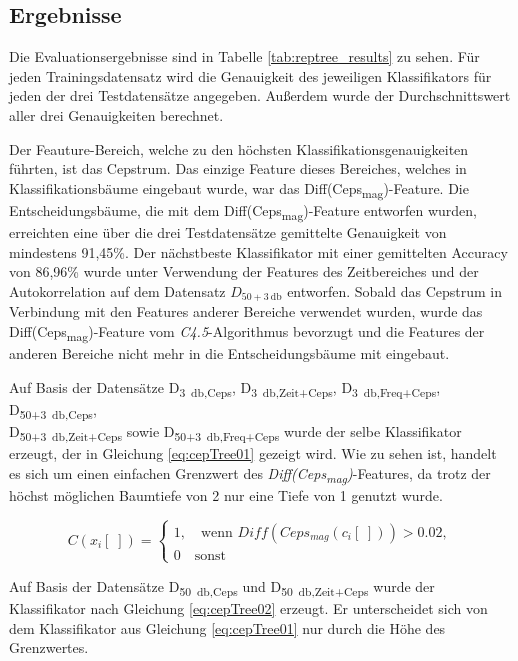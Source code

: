 \subsection{Ergebnisse}
\label{sec:vad_results}

Die Evaluationsergebnisse sind in Tabelle \ref{tab:reptree_results} zu sehen. Für jeden Trainingsdatensatz wird die Genauigkeit des jeweiligen Klassifikators für jeden der drei Testdatensätze angegeben. Außerdem wurde der Durchschnittswert aller drei Genauigkeiten berechnet.

Der Feauture-Bereich, welche zu den höchsten Klassifikationsgenauigkeiten führten, ist das Cepstrum. Das einzige Feature dieses Bereiches, welches in Klassifikationsbäume eingebaut wurde, war das Diff(Ceps\textsubscript{mag})-Feature. Die Entscheidungsbäume, die mit dem Diff(Ceps\textsubscript{mag})-Feature entworfen wurden, erreichten eine über die drei Testdatensätze gemittelte Genauigkeit von mindestens 91,45\%. Der nächstbeste Klassifikator mit einer gemittelten Accuracy von 86,96\% wurde unter Verwendung der Features des Zeitbereiches und der Autokorrelation auf dem Datensatz $D_{50+\SI{3}{\decibel}}$ entworfen. Sobald das Cepstrum in Verbindung mit den Features anderer Bereiche verwendet wurden, wurde das Diff(Ceps\textsubscript{mag})-Feature vom \emph{C4.5}-Algorithmus bevorzugt und die Features der anderen Bereiche nicht mehr in die Entscheidungsbäume mit eingebaut.

Auf Basis der Datensätze D\textsubscript{\SI{3}{\decibel},Ceps}, D\textsubscript{\SI{3}{\decibel},Zeit+Ceps}, D\textsubscript{\SI{3}{\decibel},Freq+Ceps}, D\textsubscript{50+\SI{3}{\decibel},Ceps}, \\ D\textsubscript{50+\SI{3}{\decibel},Zeit+Ceps} sowie D\textsubscript{50+\SI{3}{\decibel},Freq+Ceps} wurde der selbe Klassifikator erzeugt, der in Gleichung \ref{eq:cepTree01} gezeigt wird. Wie zu sehen ist, handelt es sich um einen einfachen Grenzwert des \emph{Diff(Ceps\textsubscript{mag})}-Features, da trotz der höchst möglichen Baumtiefe von 2 nur eine Tiefe von 1 genutzt wurde.

\begin{equation}
C(x_i[\;]) = \begin{cases}
1, \quad \text{wenn } Diff(Ceps_{mag}(c_i[\;])) > 0.02, \\
0 \quad \text{sonst}
\end{cases}
\label{eq:cepTree01}
\end{equation}


Auf Basis der Datensätze D\textsubscript{\SI{50}{\decibel},Ceps} und D\textsubscript{\SI{50}{\decibel},Zeit+Ceps} wurde der Klassifikator nach Gleichung \ref{eq:cepTree02} erzeugt. Er unterscheidet sich von dem Klassifikator aus Gleichung \ref{eq:cepTree01} nur durch die Höhe des Grenzwertes.

